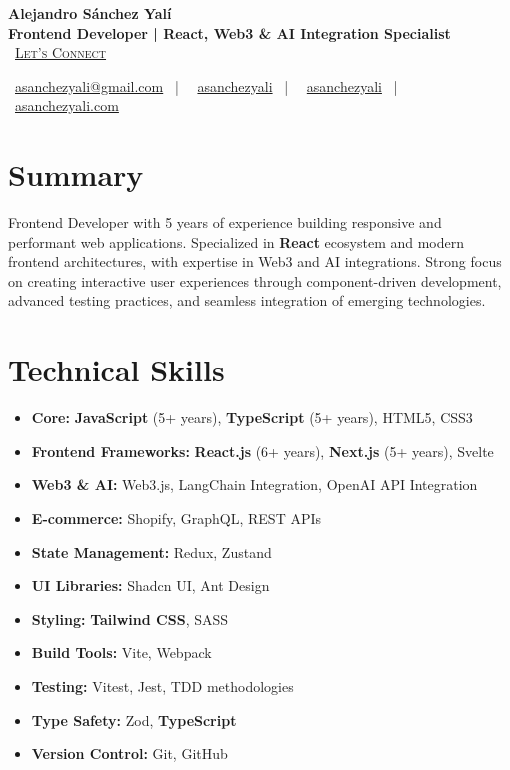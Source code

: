 \documentclass[letterpaper,11pt]{article}
\newcommand{\normalfaCalendar}{{\mdseries\faCalendar}}
\newcommand{\normalfaEnvelope}{{\mdseries\faEnvelope}}
\newcommand{\normalfaLinkedin}{{\mdseries\faLinkedin}}
\newcommand{\normalfaGithub}{{\mdseries\faGithub}}
\newcommand{\normalfaGlobe}{{\mdseries\faGlobe}}
\begin{document}
\begin{center}
\textbf{\Huge Alejandro Sánchez Yalí}\\[0.3em]
\textbf{\Large Frontend Developer | React, Web3 \& AI Integration Specialist}\\[0.5em]
\small
\normalfaCalendar\ \href{https://cal.com/asanchezyali/full-time-opportunities}{\textsc{Let's Connect}}

\vspace{1em}
\normalfaEnvelope\ \href{mailto:asanchezyali@gmail.com}{asanchezyali@gmail.com}  ~|~
\normalfaLinkedin\ \href{https://www.linkedin.com/in/asanchezyali}{asanchezyali} ~|~
\normalfaGithub\ \href{https://github.com/asanchezyali}{asanchezyali}  ~|~
\normalfaGlobe\ \href{https://asanchezyali.com}{asanchezyali.com}
\end{center}

\section{Summary}
Frontend Developer with 5 years of experience building responsive and performant web applications. Specialized in \textbf{React} ecosystem and modern frontend architectures, with expertise in Web3 and AI integrations. Strong focus on creating interactive user experiences through component-driven development, advanced testing practices, and seamless integration of emerging technologies.

\section{Technical Skills}
\begin{itemize}[leftmargin=*]
  \item \textbf{Core:} \textbf{JavaScript} (5+ years), \textbf{TypeScript} (5+ years), HTML5, CSS3
  \item \textbf{Frontend Frameworks:} \textbf{React.js} (6+ years), \textbf{Next.js} (5+ years), Svelte
  \item \textbf{Web3 \& AI:} Web3.js, LangChain Integration, OpenAI API Integration
  \item \textbf{E-commerce:} Shopify, GraphQL, REST APIs
  \item \textbf{State Management:} Redux, Zustand
  \item \textbf{UI Libraries:} Shadcn UI, Ant Design
  \item \textbf{Styling:} \textbf{Tailwind CSS}, SASS
  \item \textbf{Build Tools:} Vite, Webpack
  \item \textbf{Testing:} Vitest, Jest, TDD methodologies
  \item \textbf{Type Safety:} Zod, \textbf{TypeScript}
  \item \textbf{Version Control:} Git, GitHub
\end{itemize}
\end{document}
